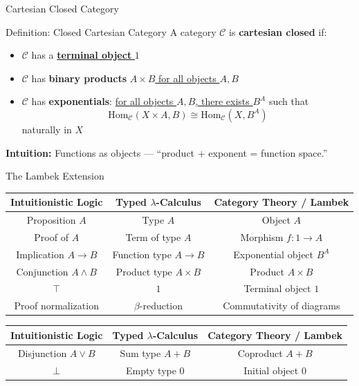 \documentclass[aspectratio=169]{beamer}
\begin{document}
\begin{frame}[fragile]{Cartesian Closed Category}
  \begin{block}{Definition: Closed Cartesian Category}
  A category \(\mathcal{C}\) is \textbf{cartesian closed} if:  
  \begin{itemize}
    \item \(\mathcal{C}\) has a \underline{\textbf{terminal object} \(1\)}
    \item \(\mathcal{C}\) has \textbf{binary products} \underline{\(A \times B\) for all objects \(A, B\)}
    \item \(\mathcal{C}\) has \textbf{exponentials}: \underline{for all objects \(A, B\), there exists \(B^A\)} such that
    \[
      \mathrm{Hom}_{\mathcal{C}}(X \times A, B) \cong \mathrm{Hom}_{\mathcal{C}}(X, B^A)
    \]
    naturally in \(X\)
  \end{itemize}
  \end{block}

  \vspace{0.5em}
  \textbf{Intuition:} Functions as objects — “product + exponent = function space.”
\end{frame}

\begin{frame}{The Lambek Extension}

\begin{table}[h!]
  \centering
  \label{tab:CHL}
  \begin{tabular}{|c|c|c|}
    \hline
    \textbf{Intuitionistic Logic} & \textbf{Typed $\lambda$-Calculus} & \textbf{Category Theory / Lambek} \\
    \hline
    Proposition $A$ & Type $A$ & Object $A$ \\
    Proof of $A$ & Term of type $A$ & Morphism $f: 1 \to A$ \\
    Implication $A \rightarrow B$ & Function type $A \to B$ & Exponential object $B^A$ \\
    Conjunction $A \land B$ & Product type $A \times B$ & Product $A \times B$ \\
    $\top$ & $1$ & Terminal object $1$ \\
    Proof normalization & $\beta$-reduction & { Commutativity of diagrams } \\
    \hline
  \end{tabular}
  \label{tab:curry-howard-lambek}
\end{table}

\begin{table}[h!]
  \centering
  \label{tab:CHL-sum}
  \begin{tabular}{|c|c|c|}
    \hline
    \textbf{Intuitionistic Logic} & \textbf{Typed $\lambda$-Calculus} & \textbf{Category Theory / Lambek} \\
    \hline
    Disjunction $A \lor B$ & Sum type $A + B$ & Coproduct $A + B$ \\
    $\bot$ & Empty type $0$ & Initial object $0$ \\
    \hline
  \end{tabular}
\end{table}
  
\end{frame}
\end{document}
